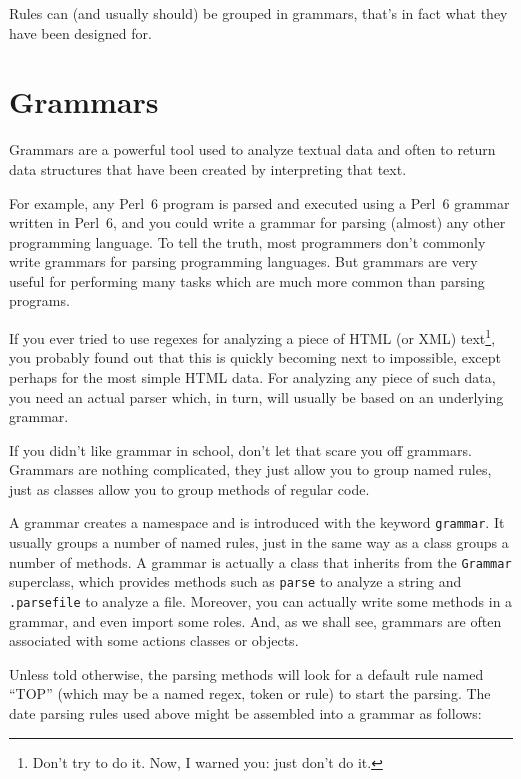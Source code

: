 Rules can (and usually should) be grouped in 
grammars, that's in fact what they have been designed 
for.

\section{Grammars}

Grammars are a powerful tool used to analyze textual data 
and often to return data structures that have been 
created by interpreting that text.

For example, any Perl~6 program is parsed and executed 
using a Perl~6 grammar written in Perl~6, and you could write a grammar 
for parsing (almost) any other programming language. 
To tell the truth, most programmers don't commonly 
write grammars for parsing programming languages. But 
grammars are very useful for performing many tasks 
which are much more common than parsing programs.


If you ever tried to use regexes for analyzing a piece 
of HTML (or XML) text\footnote{Don't try to do it. Now, 
I warned you: just don't do it.}, you 
probably found out that this is quickly becoming next 
to impossible, except perhaps for the most simple 
HTML data. For analyzing any piece of such data, you 
need an actual parser which, in turn, will usually be 
based on an underlying grammar.

If you didn't like grammar in school, don't let that 
scare you off grammars. Grammars are nothing complicated, 
they just allow you to group named rules, just as classes 
allow you to group methods of regular code.

A grammar creates a namespace and is introduced with the 
keyword {\tt grammar}. It usually groups a number of 
named rules, just in the same way as a class groups 
a number of methods. A grammar is actually a class that 
inherits from the {\tt Grammar} superclass, which provides 
methods such as {\tt parse} to analyze a string and 
{\tt .parsefile} to analyze a file. Moreover, you can 
actually write some methods in a grammar, and even import 
some roles. And, as we shall see, grammars are often 
associated with some actions classes or objects.

Unless told otherwise, the parsing methods will look for 
a default rule named ``TOP'' (which may be a named regex, 
token or rule) to start the parsing. The date parsing rules 
used above might be assembled into a grammar as follows:

